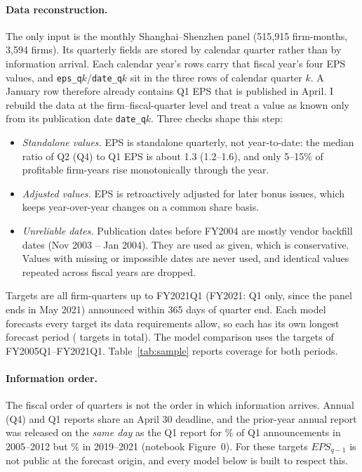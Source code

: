 \documentclass[11pt]{article}
\begin{document}
\paragraph{Data reconstruction.} The only input is the monthly Shanghai--Shenzhen panel (515,915 firm-months, 3,594 firms).
Its quarterly fields are stored by calendar quarter rather than by information arrival. Each calendar year's rows carry
that fiscal year's four EPS values, and \texttt{eps\_q$k$}/\texttt{date\_q$k$} sit in the three rows of calendar quarter
$k$. A January row therefore already contains Q1 EPS that is published in April. I rebuild the data at the
firm--fiscal-quarter level and treat a value as known only from its publication date \texttt{date\_q$k$}. Three checks
shape this step:
\begin{itemize}
\item \emph{Standalone values.} EPS is standalone quarterly, not year-to-date: the median ratio of Q2 (Q4) to Q1 EPS is
about 1.3 (1.2--1.6), and only 5--15\% of profitable firm-years rise monotonically through the year.
\item \emph{Adjusted values.} EPS is retroactively adjusted for later bonus issues, which keeps year-over-year changes on
a common share basis.
\item \emph{Unreliable dates.} Publication dates before FY2004 are mostly vendor backfill dates (Nov 2003 -- Jan 2004).
They are used as given, which is conservative. Values with missing or impossible dates are never used, and identical
values repeated across fiscal years are dropped.
\end{itemize}
Targets are all firm-quarters up to FY2021Q1 (FY2021: Q1 only, since the panel ends in May 2021) announced within
365 days of quarter end. Each model forecasts every target its data requirements allow, so each has its own longest
forecast period (\NTargetsAll{} targets in total). The model comparison uses the \NTargets{} targets of
FY2005Q1--FY2021Q1. Table~\ref{tab:sample} reports coverage for both periods.

\paragraph{Information order.} The fiscal order of quarters is not the order in which information arrives. Annual (Q4)
and Q1 reports share an April 30 deadline, and the prior-year annual report was released on the \emph{same day} as
the Q1 report for \SameDayEarly\% of Q1 announcements in 2005--2012 but \SameDayLate\% in 2019--2021
(notebook Figure~0). For these targets $EPS_{q-1}$ is not public at the forecast origin, and every model below is
built to respect this.
\end{document}
